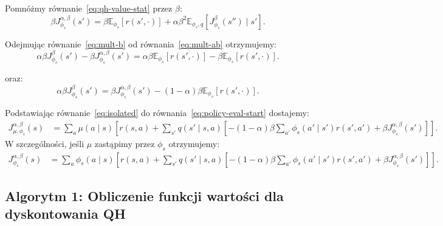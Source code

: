Pomnóżmy równanie~\eqref{eq:qh-value-stat} przez $\beta$:
\begin{equation}
\beta J^{\alpha, \beta}_{\phi_s}(s') = \beta \mathbb{E}_{\phi_s} [r(s', \cdot)] + \alpha \beta^2 \mathbb{E}_{\phi_s, q} [J^{\beta}_{\phi_s}(s'') \mid s'].
\label{eq:mult-b}
\end{equation}

Odejmując równanie~\eqref{eq:mult-b} od równania~\eqref{eq:mult-ab} otrzymujemy:
\begin{equation}
\alpha \beta J^{\beta}_{\phi_s}(s') - \beta J^{\alpha, \beta}_{\phi_s}(s') = \alpha \beta \mathbb{E}_{\phi_s} [r(s', \cdot)] - \beta \mathbb{E}_{\phi_s} [r(s', \cdot)].
\end{equation}

oraz:
\begin{equation}
\alpha \beta J^{\beta}_{\phi_s}(s') = \beta J^{\alpha, \beta}_{\phi_s}(s') - (1 - \alpha) \beta \mathbb{E}_{\phi_s} [r(s', \cdot)].
\label{eq:isolated}
\end{equation}

Podstawiając równanie~\eqref{eq:isolated} do równania~\eqref{eq:policy-eval-start} dostajemy:
\begin{align}
J^{\alpha, \beta}_{\mu, \phi_s}(s) &= \sum_a \mu(a\mid s) \left[ r(s, a) + \sum_{s'} q(s'\mid s, a) \left[ -(1 - \alpha)\beta \sum_{a'} \phi_s(a'\mid s') r(s', a') + \beta J^{\alpha, \beta}_{\phi_s}(s') \right] \right].
\label{eq:final-policy-eval}
\end{align}
W szczególności, jeśli $\mu$ zastąpimy przez $\phi_s$ otrzymujemy:
\begin{align}
J^{\alpha, \beta}_{\phi_s}(s) &= \sum_a \phi_s(a\mid s) \left[ r(s, a) + \sum_{s'} q(s'\mid s, a) \left[ -(1 - \alpha)\beta \sum_{a'} \phi_s(a'\mid s') r(s', a') + \beta J^{\alpha, \beta}_{\phi_s}(s') \right] \right].
\label{eq:final-policy-eval-stationary}
\end{align}

\subsection{Algorytm 1: Obliczenie funkcji wartości dla dyskontowania QH}

